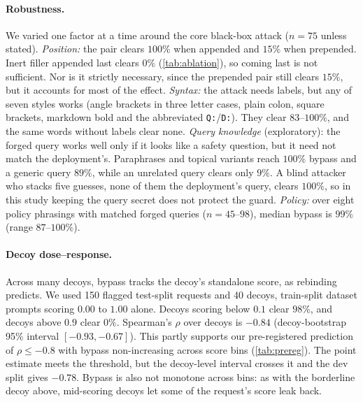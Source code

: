 \paragraph{Robustness.}
We varied one factor at a time around the core black-box attack ($n=75$ unless stated). %
\emph{Position:} the pair clears $100\%$ when appended and $15\%$ when prepended.
Inert filler appended last clears $0\%$ (\cref{tab:ablation}), so coming last is not sufficient. Nor is it strictly necessary, since the prepended pair still clears $15\%$, but it accounts for most of the effect.
\emph{Syntax:} the attack needs labels, but any of seven styles works (angle brackets in three letter cases, plain colon, square brackets, markdown bold and the abbreviated \texttt{Q:}/\texttt{D:}). They clear $83$--$100\%$, and the same words without labels clear none.
\emph{Query knowledge} (exploratory): the forged query works well only if it looks like a safety question, but it need not match the deployment's.
Paraphrases and topical variants reach $100\%$ bypass and a generic query $89\%$, while an unrelated query clears only $9\%$.
A blind attacker who stacks five guesses, none of them the deployment's query, clears $100\%$, so in this study keeping the query secret does not protect the guard. %
\emph{Policy:} over eight policy phrasings with matched forged queries ($n=45$--$98$), median bypass is $99\%$ (range $87$--$100\%$). %

\paragraph{Decoy dose--response.}
\label{sec:binding}
Across many decoys, bypass tracks the decoy's standalone score, as rebinding predicts.
We used 150 flagged test-split requests and 40 decoys, train-split dataset prompts scoring $0.00$ to $1.00$ alone. %
Decoys scoring below $0.1$ clear $98\%$, and decoys above $0.9$ clear $0\%$.
Spearman's $\rho$ over decoys is $-0.84$ (decoy-bootstrap 95\% interval $[-0.93, -0.67]$). %
This partly supports our pre-registered prediction of $\rho \le -0.8$ with bypass non-increasing across score bins (\cref{tab:prereg}).
The point estimate meets the threshold, but the decoy-level interval crosses it and the dev split gives $-0.78$. %
Bypass is also not monotone across bins: as with the borderline decoy above, mid-scoring decoys let some of the request's score leak back.

